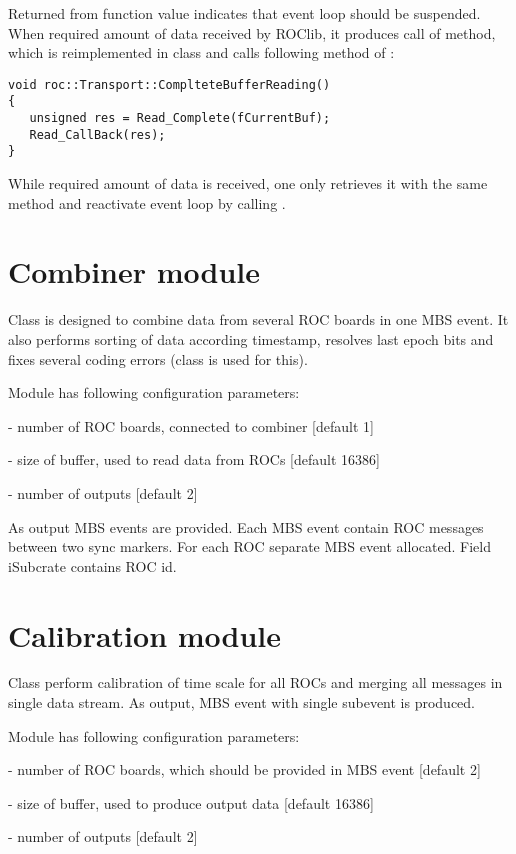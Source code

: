Returned from function  value  indicates 
that event loop should be suspended. When required amount of data received by ROClib,
it produces call of  method, which is reimplemented in  
class and calls following method of : 

\begin{verbatim}
void roc::Transport::ComplteteBufferReading()
{
   unsigned res = Read_Complete(fCurrentBuf);
   Read_CallBack(res);
}
\end{verbatim}

While required amount of data is received,
one only retrieves it with the same  method and 
reactivate event loop by calling .   


\section{Combiner module}

Class  is designed to combine data from several ROC boards in one MBS event. It also performs sorting of
data according timestamp, resolves last epoch bits and fixes several coding errors (class  is
used for this).

Module has following configuration parameters:
\bbul
\item {}     - number of ROC boards, connected to combiner [default 1]  
\item {}  - size of buffer, used to read data from ROCs [default 16386]
\item {}  - number of outputs [default 2]
\ebul

As output MBS events are provided. Each MBS event contain ROC messages between two sync markers.
For each ROC separate MBS event allocated. Field iSubcrate contains ROC id.


\section{Calibration module}

Class  perform calibration of time scale for all
ROCs and merging all messages in single data stream. As output, MBS event with single
subevent is produced. 

Module has following configuration parameters:
\bbul
\item {}     - number of ROC boards, which should be provided in MBS event [default 2]  
\item {}  - size of buffer, used to produce output data [default 16386]
\item {}  - number of outputs [default 2]
\ebul
 

